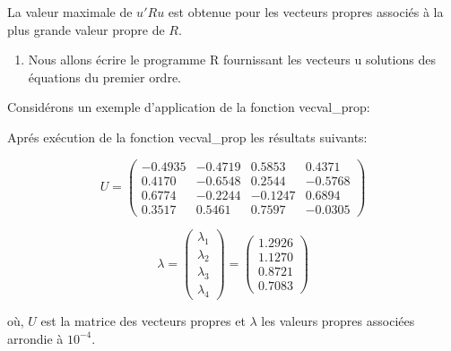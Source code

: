 \documentclass[
]{article}
\newenvironment{Shaded}{\begin{snugshade}}{\end{snugshade}}
\newcommand{\CommentTok}[1]{\textcolor[rgb]{0.56,0.35,0.01}{\textit{#1}}}
\newcommand{\FunctionTok}[1]{\textcolor[rgb]{0.13,0.29,0.53}{\textbf{#1}}}
\newcommand{\NormalTok}[1]{#1}
\newcommand{\OtherTok}[1]{\textcolor[rgb]{0.56,0.35,0.01}{#1}}
\newcommand{\SpecialCharTok}[1]{\textcolor[rgb]{0.81,0.36,0.00}{\textbf{#1}}}
\providecommand{\tightlist}{%
  \setlength{\itemsep}{0pt}\setlength{\parskip}{0pt}}
\begin{document}
La valeur maximale de \(u'Ru\) est obtenue pour les vecteurs propres
associés à la plus grande valeur propre de \(R\).

\begin{enumerate}
\def\labelenumi{\alph{enumi})}
\setcounter{enumi}{2}
\tightlist
\item
  Nous allons écrire le programme R fournissant les vecteurs u solutions
  des équations du premier ordre.
\end{enumerate}

Considérons un exemple d'application de la fonction vecval\_prop:

\begin{Shaded}
\end{Shaded}

Aprés exécution de la fonction vecval\_prop les résultats suivants:

\[U = \begin{pmatrix}
-0.4935 & -0.4719 & 0.5853 & 0.4371 \\
0.4170 & -0.6548 & 0.2544 & -0.5768 \\
0.6774 & -0.2244 & -0.1247 & 0.6894 \\
0.3517 & 0.5461 & 0.7597 & -0.0305 
\end{pmatrix}
\]

\[\lambda = \begin{pmatrix} \lambda_1 \\ \lambda_2 \\ \lambda_3 \\ \lambda_4 \end{pmatrix} = \begin{pmatrix} 1.2926 \\ 1.1270 \\ 0.8721 \\ 0.7083 \end{pmatrix}
\]

où, \(U\) est la matrice des vecteurs propres et \(\lambda\) les valeurs
propres associées arrondie à \(10^{-4}\).
\end{document}
